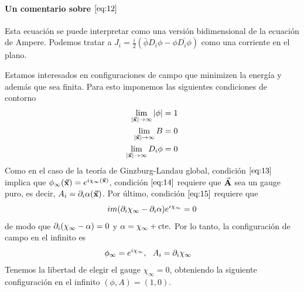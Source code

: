 \paragraph{Un comentario sobre $\eqref{eq:12}$} Esta ecuación se puede interpretar como una versión bidimensional de la ecuación de Ampere. Podemos tratar a $J_i=\frac{i}{2}(\bar\phi D_i\phi-\phi\overline{D_i\phi})$ como una corriente en el plano.

Estamos interesados en configuraciones de campo que minimizen la energía y además que sea finita. Para esto imponemos las siguientes condiciones de contorno
\begin{align}
    \lim_{|\vec{\mathbf{x}}|\rightarrow\infty} |\phi| &= 1 \label{eq:13}\\
    \lim_{|\vec{\mathbf{x}}|\rightarrow\infty} B &= 0 \label{eq:14}\\
    \lim_{|\vec{\mathbf{x}}|\rightarrow\infty} D_i\phi &=0\label{eq:15}
\end{align}
Como en el caso de la teoría de Ginzburg-Landau global, condición $\eqref{eq:13}$ implica que $\phi_\infty(\vec{\mathbf{x}}) = e^{i\chi_\infty(\vec{\mathbf{x}})}$, condición $\eqref{eq:14}$ requiere que $\vec{\mathbf{A}}$ sea un gauge puro, es decir, $A_i=\partial_i\alpha(\vec{\mathbf{x}})$. Por último, condición $\eqref{eq:15}$ requiere que
\begin{align}
    im(\partial_i\chi_\infty-\partial_i\alpha)e^{i\chi_\infty} =0
\end{align}
de modo que $\partial_i(\chi_\infty-\alpha)=0$ y $\alpha=\chi_\infty+\text{cte.}$ Por lo tanto, la configuración de campo en el infinito es
\begin{align}
    \phi_\infty = e^{i\chi_\infty} &,\ \ A_i = \partial_i\chi_\infty \label{eq:16}
\end{align}
Tenemos la libertad de elegir el gauge $\chi_\infty=0$, obteniendo la siguiente configuración en el infinito $(\phi,A) = (1,0)$.

